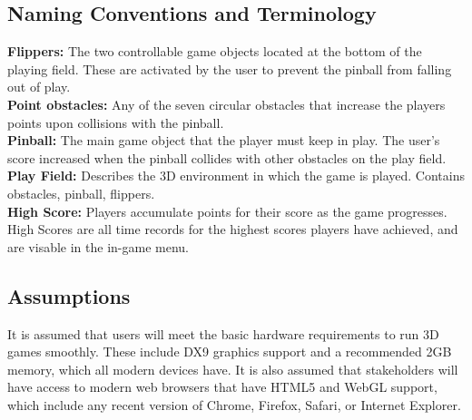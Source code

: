 \documentclass[12pt]{article}
\begin{document}
\subsection{Naming Conventions and Terminology}

\textbf{Flippers:} The two controllable game objects located at the bottom of the playing field. These are activated by the user to prevent the pinball from falling out of play.\\

\textbf{Point obstacles:} Any of the seven circular obstacles that increase the players points upon collisions with the pinball.\\

\textbf{Pinball:} The main game object that the player must keep in play. The user's score increased when the pinball collides with other obstacles on the play field.\\

\textbf{Play Field:} Describes the 3D environment in which the game is played. Contains obstacles, pinball, flippers.\\

\textbf{High Score:} Players accumulate points for their score as the game progresses. High Scores are all time records for the highest scores players have achieved, and are visable in the in-game menu.


\subsection{Assumptions}	
It is assumed that users will meet the basic hardware requirements to run 3D games smoothly. These include DX9 graphics support and a recommended 2GB memory, which all modern devices have. It is also assumed that stakeholders will have access to modern web browsers that have HTML5 and WebGL support, which include any recent version of Chrome, Firefox, Safari, or Internet Explorer.

	
\end{document}
